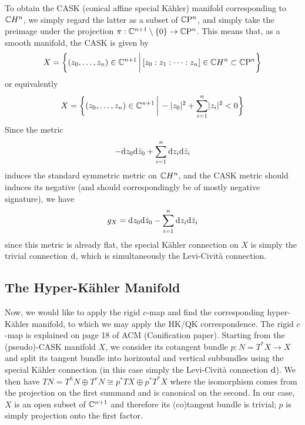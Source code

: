 \documentclass[parskip=half]{scrartcl}
\begin{document}
To obtain the CASK (conical affine special K\"ahler) manifold corresponding to $\mathbb{C} H^n$, we simply regard the latter as a subset of $\mathbb{C}\mathrm{P}^n$, and simply take the preimage under the projection $\pi: \mathbb{C}^{n+1}\setminus \{0\}\to \mathbb{C}\mathrm{P}^n$. This means that, as a smooth manifold, the CASK is given by
\begin{equation*}
	X=\bigg\{ (z_0,\dots,z_n)\in \mathbb{C}^{n+1}\,\bigg|\, [z_0:z_1:\dots : z_n]\in \mathbb{C} H^n\subset \mathbb{C}\mathrm{P}^n\bigg\}
\end{equation*}
or equivalently 
\begin{equation*}
	X=\bigg\{ (z_0,\dots,z_n)\in \mathbb{C}^{n+1}\,\bigg|\, -\lvert z_0 \rvert^2+\sum_{i=1}^n \lvert z_i \rvert^2<0\bigg\}
\end{equation*}
Since the metric
\begin{equation*}
	-\mathrm{d} z_0 \mathrm{d} \bar z_0 + \sum_{i=1}^n\mathrm{d} z_i\mathrm{d} \bar z_i
\end{equation*}
induces the standard symmetric metric on $\mathbb{C} H^n$, and the CASK metric should induces its negative (and should correspondingly be of mostly negative signature), we have
\begin{equation*}
	g_X=\mathrm{d} z_0 \mathrm{d} \bar z_0 - \sum_{i=1}^n\mathrm{d} z_i\mathrm{d} \bar z_i
\end{equation*}
since this metric is already flat, the special K\"ahler connection on $X$ is simply the trivial connection $\mathrm{d}$, which is simultaneously the Levi-Civit\`a connection. 

\subsection{The Hyper-K\"ahler Manifold}

Now, we would like to apply the rigid $c$-map and find the corresponding hyper-K\"ahler manifold, to which we may apply the HK/QK correspondence. The rigid $c$-map is explained on page 18 of ACM (Conification paper). Starting from the (pseudo)-CASK manifold $X$, we consider its cotangent bundle $p:N=T^*X\to X$ and split its tangent bundle into horizontal and vertical subbundles using the special K\"ahler connection (in this case simply the Levi-Civit\`a connection $\mathrm{d}$). We then have $TN=T^hN\oplus T^vN\cong p^*TX\oplus p^*T^*X$ where the isomorphism comes from the projection on the first summand and is canonical on the second. In our case, $X$ is an open subset of $\mathbb{C}^{n+1}$ and therefore its (co)tangent bundle is trivial; $p$ is simply projection onto the first factor. 
\end{document}
